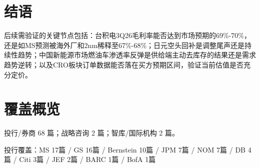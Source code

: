 \documentclass[11pt]{ctexart}
\begin{document}
\section{结语}
后续需验证的关键节点包括：台积电3Q26毛利率能否达到市场预期的69\%-70\%，还是如MS预测被海外厂和2nm稀释至67\%-68\%；日元空头回补是调整尾声还是持续性趋势；中国新能源市场燃油车渗透率反弹是供给端主动去库存的结果还是需求趋势逆转；以及CRO板块订单数据能否落在买方预期区间，验证当前估值是否充分定价。
\newpage
\section{覆盖概览}
投行/券商 68 篇；战略咨询 2 篇；智库/国际机构 2 篇。\par
投行覆盖：MS 17篇 / GS 16篇 / Bernstein 10篇 / JPM 7篇 / NOM 7篇 / DB 4篇 / Citi 3篇 / JEF 2篇 / BARC 1篇 / BofA 1篇\par
\end{document}
